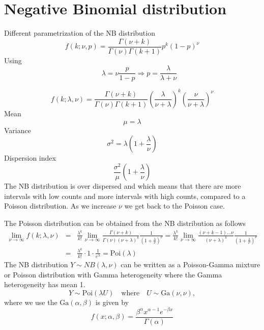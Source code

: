 \documentclass[12pt]{article}
\begin{document}
\section{Negative Binomial distribution}
\label{c_sec:nb}
Different parametrization of the NB distribution
\begin{equation}
f(k;\nu, p)= \frac{\Gamma(\nu+k)}{\Gamma(\nu)\Gamma(k+1)} p^{k} (1-p)^{\nu}
\end{equation}
Using 
\begin{equation}
 \quad  \quad \lambda=\nu\frac{p}{1-p} \Rightarrow p=\frac{\lambda}{\lambda+\nu}
\end{equation}

\begin{equation}
f(k;\lambda, \nu)= \frac{\Gamma(\nu+k)}{\Gamma(\nu)\Gamma(k+1)} \left(\frac{\lambda}{\nu+\lambda} \right)^{k} \left(\frac{\nu}{\nu+\lambda} \right)^{\nu} 
\end{equation}
Mean
\begin{equation}
\mu=\lambda
\end{equation}
Variance
\begin{equation}
\sigma ^2 =\lambda \left(1+\frac{\lambda}{\nu}\right)
\end{equation}
Dispersion index
\begin{equation}
 \frac{\sigma^2}{\mu}\left(1+\frac{\lambda}{\nu}\right) 
\end{equation}
The NB distribution is over dispersed and which means that  there are more intervals with low counts and more intervals with high counts, compared to a Poisson distribution. As we increase $\nu$ we get back to the Poisson case. 


The Poisson distribution can be obtained from the NB distribution as follows
\begin{eqnarray}
\lim_{\nu \rightarrow \infty} f(k;\lambda, \nu)&=&\frac{\lambda^k }{k!} \lim_{\nu \rightarrow \infty}  \frac{\Gamma(\nu+k)}{\Gamma(\nu)(\nu+\lambda)^k}\frac{1}{\left( 1+\frac{\lambda}{\nu} \right)^{\nu} }=\frac{\lambda^k }{k!} \lim_{\nu \rightarrow \infty}  \frac{(\nu+k-1)\ldots \nu}{(\nu+\lambda)^k}\frac{1}{\left( 1+\frac{\lambda}{\nu} \right)^{\nu} } \nonumber \\ &=& \frac{\lambda^k }{k!} \cdot 1 \cdot  \frac{1}{e^\lambda} = \text{Poi}(\lambda)
\end{eqnarray}
The NB distribution  $Y \sim NB(\lambda, \nu)$ can be written as a Poisson-Gamma mixture or Poisson distribution with Gamma heterogeneity where the Gamma heterogeneity has mean 1.
\begin{equation}
Y \sim \text{Poi}(\lambda U) \quad \text{where} \quad U \sim \text{Ga}(\nu,\nu),
\end{equation}
where we use the $\text{Ga}(\alpha,\beta)$ is given by
\begin{equation}
f(x; \alpha, \beta)= \frac{\beta^\alpha x^{\alpha-1} e^{-\beta x} }{\Gamma(\alpha)}
\end{equation}
\end{document}
